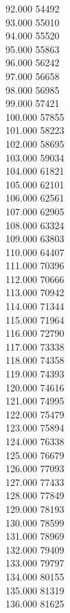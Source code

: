 { 92.000	54492 \\
 93.000	55010 \\
 94.000	55520 \\
 95.000	55863 \\
 96.000	56242 \\
 97.000	56658 \\
 98.000	56985 \\
 99.000	57421 \\
 100.000	57855 \\
 101.000	58223 \\
 102.000	58695 \\
 103.000	59034 \\
 104.000	61821 \\
 105.000	62101 \\
 106.000	62561 \\
 107.000	62905 \\
 108.000	63324 \\
 109.000	63803 \\
 110.000	64407 \\
 111.000	70396 \\
 112.000	70666 \\
 113.000	70942 \\
 114.000	71344 \\
 115.000	71964 \\
 116.000	72790 \\
 117.000	73338 \\
 118.000	74358 \\
 119.000	74393 \\
 120.000	74616 \\
 121.000	74995 \\
 122.000	75479 \\
 123.000	75894 \\
 124.000	76338 \\
 125.000	76679 \\
 126.000	77093 \\
 127.000	77433 \\
 128.000	77849 \\
 129.000	78193 \\
 130.000	78599 \\
 131.000	78969 \\
 132.000	79409 \\
 133.000	79797 \\
 134.000	80155 \\
 135.000	81319 \\
 136.000	81625 \\
}
